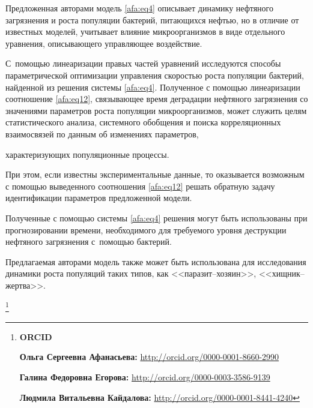\smallskip



 Предложенная авторами модель \eqref{afa:eq4} описывает динамику нефтяного загрязнения и роста популяции бактерий, питающихся нефтью, но в отличие от известных моделей, учитывает влияние микроорганизмов в виде отдельного уравнения, описывающего управляющее воздействие. 

С~помощью линеаризации правых частей уравнений исследуются способы параметрической оптимизации управления скоростью роста популяции бактерий, найденной из решения системы \eqref{afa:eq4}. Полученное с помощью линеаризации соотношение \eqref{afa:eq12}, связывающее время деградации нефтяного загрязнения со значениями параметров роста популяции микроорганизмов, может служить целям статистического анализа, системного обобщения и поиска корреляционных взаимосвязей по данным об изменениях параметров,

характеризующих популяционные процессы. 

При этом, если известны экспериментальные данные, то оказывается возможным с помощью выведенного соотношения \eqref{afa:eq12} решать обратную задачу идентификации параметров предложенной модели. 

Полученные с помощью системы \eqref{afa:eq4} решения могут быть использованы при прогнозировании времени, необходимого для требуемого уровня деструкции нефтяного загрязнения с~помощью бактерий. 

Предлагаемая авторами модель также может быть использована для исследования динамики роста популяций таких типов, как  <<паразит--хозяин>>, <<хищник--жертва>>.





\thanks{{\bf ORCID}





{\bf Ольга Сергеевна Афанасьева:} \url{http://orcid.org/0000-0001-8660-2990}



{\bf Галина Федоровна Егорова:} \url{http://orcid.org/0000-0003-3586-9139}



{\bf Людмила Витальевна Кайдалова:} \url{http://orcid.org/0000-0001-8441-4240}







}





